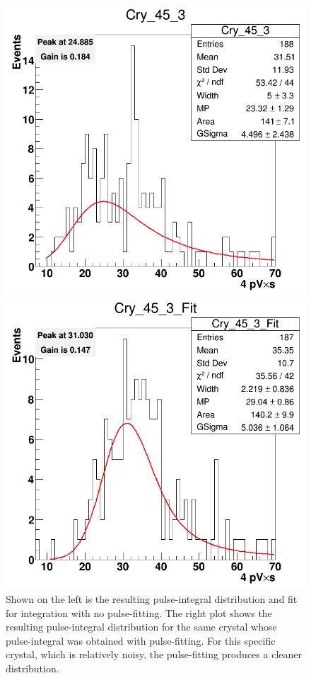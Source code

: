 \documentclass[twoside]{article}
\begin{document}
\begin{figure}[hbt]
\begin{minipage}{0.5\textwidth}
 \includegraphics[width=\textwidth]{pics/Cry_45_3.png}
\end{minipage}\hfill\begin{minipage}{0.5\textwidth}
 \includegraphics[width=\textwidth]{pics/Cry_45_3_Fit.png}
 \end{minipage}
  \caption{Shown on the left is the resulting pulse-integral distribution and fit for integration with no pulse-fitting. The right plot shows the resulting pulse-integral distribution for the same crystal whose pulse-integral was obtained with pulse-fitting. For this specific crystal, which is relatively noisy, the pulse-fitting produces a cleaner distribution. }
  \label{fig:compareResultsMarked}
\end{figure}
\end{document}
